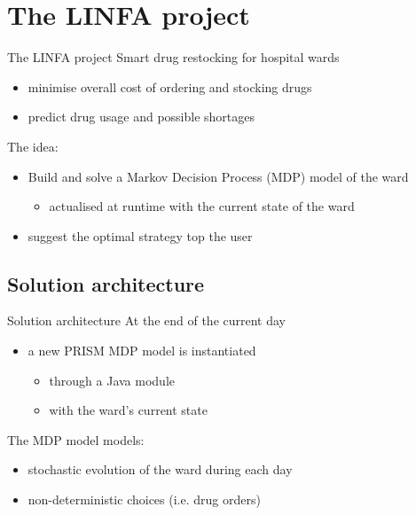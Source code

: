 
\section{The LINFA project}
  \begin{frame}{The LINFA project}
    Smart drug restocking for hospital wards
    \begin{itemize}
      \item minimise overall cost of ordering and stocking drugs
      \item predict drug usage and possible shortages
    \end{itemize}
    
    \vspace{2em}
    The idea:
    \begin{itemize}
      \item Build and solve a Markov Decision Process (MDP) model of the ward
      \begin{itemize}
        \item actualised at runtime with the current state of the ward
      \end{itemize}
      \item suggest the optimal strategy top the user
    \end{itemize}
  \end{frame}
  
  \subsection{Solution architecture}
    \begin{frame}{Solution architecture}
      At the end of the current day
      \begin{itemize}
        \item a new PRISM MDP model is instantiated
        \begin{itemize}
          \item through a Java module
          \item with the ward's current state
        \end{itemize}
      \end{itemize}
      
      \vspace{1em}
      The MDP model models:
      \begin{itemize}
        \item stochastic evolution of the ward during each day
        \item non-deterministic choices (i.e. drug orders)
      \end{itemize}

      \begin{center}\scalebox{0.8}{}\end{center}

    \end{frame}